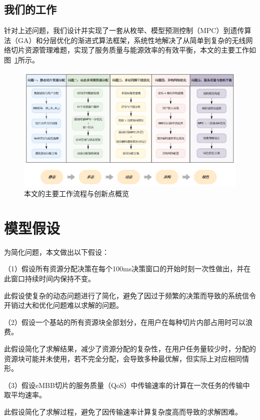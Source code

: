 \documentclass[withoutpreface,bwprint]{cumcmthesis}
\begin{document}

\subsection{我们的工作}
针对上述问题，我们设计并实现了一套从枚举、模型预测控制（MPC）到遗传算法（GA）和分层优化的渐进式算法框架，系统性地解决了从简单到复杂的无线网络切片资源管理难题，实现了服务质量与能源效率的有效平衡，本文的主要工作如图~\ref{fig:our_work}所示。
\begin{figure}[H]
    \centering
    \includegraphics[width=1\textwidth]{figures/我们的工作.pdf}
    \caption{本文的主要工作流程与创新点概览}
    \label{fig:our_work}
\end{figure}


\section{模型假设}
为简化问题，本文做出以下假设：

（1）假设所有资源分配决策在每个100ms决策窗口的开始时刻一次性做出，并在此窗口持续时间内保持不变。

    此假设使复杂的动态问题进行了简化，避免了因过于频繁的决策而导致的系统信令开销过大和优化问题难以求解的问题。

（2）假设一个基站的所有资源块全部划分，在用户在每种切片内部占用时可以浪费。

    此假设简化了求解结果，减少了资源分配的复杂性，在用户任务量较少时，分配的资源块可能并未使用，若不完全分配，会导致多种最优解，但实际上对应相同情形。

（3）假设eMBB切片的服务质量（QoS）中传输速率的计算在一次任务的传输中取平均速率。

    此假设简化了求解过程，避免了因传输速率计算复杂度高而导致的求解困难。
    
\end{document}
